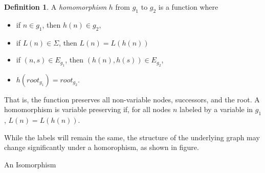 \documentclass{article}
\theoremstyle{definition}
\newtheorem{definition}{Definition}[section]
\begin{document}
\theoremstyle{definition}
\begin{definition}
A \textit{homomorphism} $h$ from $g_1$ to $g_2$ is a function where
\begin{itemize}
    \item if $n \in g_1$, then $h(n) \in g_2$,
    \item if $L(n)\in \Sigma$, then $L(n) = L(h(n))$
    \item if $(n, s) \in E_{g_1}$, then $(h(n), h(s)) \in E_{g_2}$,
    \item $h(root_{g_1}) = root_{g_2}$.
\end{itemize}
That is, the function preserves all non-variable nodes, successors, and the root.
A homomorphism is variable preserving if, for all nodes $n$ labeled by a variable in $g_1$, $L(n) = L(h(n))$.
\end{definition}

While the labels will remain the same, the structure of the underlying graph may change significantly under a homorophism,
as shown in figure. %

\begin{figure}
\end{figure}
An Isomorphism 
\end{document}
